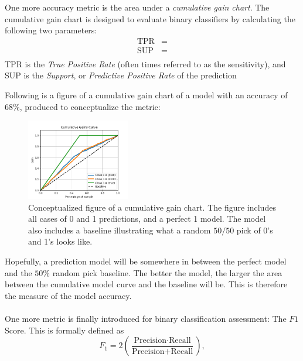             One more accuracy metric is the area under a \textit{cumulative gain chart}. The cumulative gain chart is designed to evaluate binary classifiers by calculating the following two parameters:
            \begin{align}
                \text{TPR} &= \\
                \text{SUP} &= \\
            \end{align}
            TPR is the \textit{True Positive Rate} (often times referred to as the sensitivity), and SUP is the \textit{Support}, or \textit{Predictive Positive Rate} of the prediction
            
            Following is a figure of a cumulative gain chart of a model with an accuracy of $68\%$, produced to conceptualize the metric:
            \begin{figure}[H]
                \centering
                \includegraphics[width=0.4\textwidth]{figures/cumulative-gain_curve-concept.png}
                \caption{Conceptualized figure of a cumulative gain chart. The figure includes all cases of 0 and 1 predictions, and a perfect 1 model. The model also includes a baseline illustrating what a random $50/50$ pick of 0's and 1's looks like.}
                \label{fig:conceptual_cumulative_gains}
            \end{figure}
            Hopefully, a prediction model will be somewhere in between the perfect model and the $50\%$ random pick baseline. The better the model, the larger the area between the cumulative model curve and the baseline will be. This is therefore the measure of the model accuracy.\\\\
            One more metric is finally introduced for binary classification assessment: The $F1$ Score. This is formally defined as
            \begin{equation}
                F_1 = 2\left(\frac{\text{Precision}\cdot \text{Recall}}{\text{Precision} + \text{Recall}}\right),
            \end{equation}
